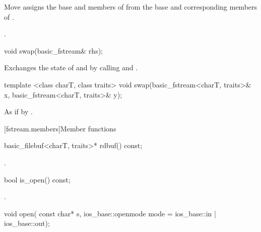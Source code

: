\begin{itemdescr}
\pnum
\effects Move assigns the base and members of  from the base and corresponding
members of .

\pnum
\returns {}.
\end{itemdescr}

%
%
\begin{itemdecl}
void swap(basic_fstream& rhs);
\end{itemdecl}

\begin{itemdescr}
\pnum
\effects Exchanges the state of 
and  by calling
 and
.
\end{itemdescr}

%
%
\begin{itemdecl}
template <class charT, class traits>
  void swap(basic_fstream<charT, traits>& x,
            basic_fstream<charT, traits>& y);
\end{itemdecl}

\begin{itemdescr}
\pnum
\effects As if by .
\end{itemdescr}

[fstream.members]{Member functions}

%
\begin{itemdecl}
basic_filebuf<charT, traits>* rdbuf() const;
\end{itemdecl}

\begin{itemdescr}
\pnum
\returns
{}.
\end{itemdescr}

%
\begin{itemdecl}
bool is_open() const;
\end{itemdecl}

\begin{itemdescr}
\pnum
\returns
{}.
\end{itemdescr}

%
\begin{itemdecl}
void open(
  const char* s,
  ios_base::openmode mode = ios_base::in | ios_base::out);
\end{itemdecl}

